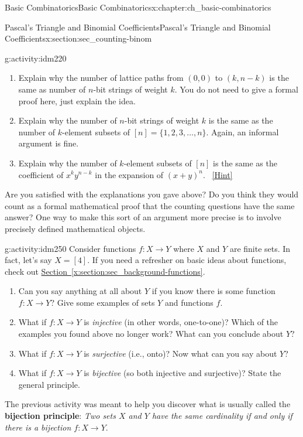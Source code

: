 \documentclass[oneside,10pt,]{book}
\newcommand{\terminology}[1]{\textbf{#1}}
\numberwithin{equation}{chapter}
\begin{document}
\begin{chapterptx}{Basic Combinatorics}{}{Basic Combinatorics}{}{}{x:chapter:ch_basic-combinatorics}
\begin{sectionptx}{Pascal's Triangle and Binomial Coefficients}{}{Pascal's Triangle and Binomial Coefficients}{}{}{x:section:sec_counting-binom}
\begin{activity}{}{g:activity:idm220}%
\begin{enumerate}[font=\bfseries,label=(\alph*),ref=\alph*]
\item{}Explain why the number of lattice paths from \((0,0)\) to \((k,n-k)\) is the same as number of \(n\)-bit strings of weight \(k\). You do not need to give a formal proof here, just explain the idea.%
\item{}Explain why the number of \(n\)-bit strings of weight \(k\) is the same as the number of \(k\)-element subsets of \([n] = \{1,2,3,\ldots, n\}\).   Again, an informal argument is fine.%
\item{}Explain why the number of \(k\)-element subsets of \([n]\) is the same as the coefficient of \(x^ky^{n-k}\) in the expansion of \((x+y)^n\).%
\qquad~\hfill{\tiny\hyperlink{g:hint:idm240-back}{[Hint]}}\end{enumerate}
\end{activity}
Are you satisfied with the explanations you gave above?  Do you think they would count as a formal mathematical proof that the counting questions have the same answer?  One way to make this sort of an argument more precise is to involve precisely defined mathematical objects.%
\begin{activity}{}{g:activity:idm250}%
Consider functions \(f:X \to Y\) where \(X\) and \(Y\) are finite sets.  In fact, let's say \(X = [4]\). If you need a refresher on basic ideas about functions, check out \hyperref[x:section:sec_background-functions]{Section~\ref{x:section:sec_background-functions}}.%
\begin{enumerate}[font=\bfseries,label=(\alph*),ref=\alph*]
\item{}Can you say anything at all about \(Y\) if you know there is some function \(f:X \to Y\)?  Give some examples of sets \(Y\) and functions \(f\).%
\item{}What if \(f:X \to Y\) is \emph{injective} (in other words, one-to-one)?  Which of the examples you found above no longer work?  What can you conclude about \(Y\)?%
\item{}What if \(f:X \to Y\) is \emph{surjective} (i.e., onto)?  Now what can you say about \(Y\)?%
\item{}What if \(f:X\to Y\) is \emph{bijective} (so both injective and surjective)?  State the general principle.%
\end{enumerate}
\end{activity}
The previous activity was meant to help you discover what is usually called the \terminology{bijection principle}: \emph{Two sets \(X\) and \(Y\) have the same cardinality if and only if there is a bijection \(f:X \to Y\)}.%

\end{sectionptx}
\end{chapterptx}
\end{document}
